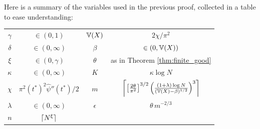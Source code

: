 Here is a summary of the variables used in the previous proof, collected in a table to ease understanding:
\begin{center}
\begin{tabular}{|c|c||c|c|} 
 \hline
 $\gamma$ 	& $\in (0, 1)$ 			&	$\bb{V}(X)$		& $2 \chi / \pi^2$		        \\

 $\delta$ 	& $\in (0, \infty)$ 	&  	$\beta$			& $\in (0, \bb{V}(X))$								            \\ 

 $\xi$ 		& $\in (0, \gamma)$ 	&	$\theta$	& as in Theorem \ref{thm:finite_good}			                             \\ 

 $\kappa$	& $\in (0, \infty)$		&	$K$ 				& $\kappa \log N$	                 \\

$\chi$ 			& $\pi^2 (t^*)^2 \widehat{\psi}''(t^*) / 2$ &  $m$ & $\ceil*{ \left[\frac{2 \theta}{\pi^2}\right]^{3/2} \left( \frac{(1 + \lambda) \log N}{(\bb{V}(X) - \beta)^{1/2}}\right)^3}$\\

$\lambda$	& $\in (0, \infty)$ & $\epsilon$ & $\theta\,m^{-2/3}$ \\

$n$ 		& $\ceil{N^\xi}$     & & \\

 \hline
\end{tabular}
\end{center}










